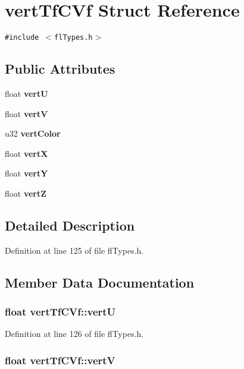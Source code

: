 \section{vert\-Tf\-CVf Struct Reference}
\label{structvertTfCVf}
{\tt \#include $<$fl\-Types.h$>$}

\subsection*{Public Attributes}
\begin{CompactItemize}
\item 
float {\bf vert\-U}
\item 
float {\bf vert\-V}
\item 
u32 {\bf vert\-Color}
\item 
float {\bf vert\-X}
\item 
float {\bf vert\-Y}
\item 
float {\bf vert\-Z}
\end{CompactItemize}


\subsection{Detailed Description}




Definition at line 125 of file fl\-Types.h.

\subsection{Member Data Documentation}
\subsubsection{\setlength{\rightskip}{0pt plus 5cm}float {\bf vert\-Tf\-CVf::vert\-U}}\label{structvertTfCVf_b605bbb90329cf79b2261af9019c8cb5}




Definition at line 126 of file fl\-Types.h.
\subsubsection{\setlength{\rightskip}{0pt plus 5cm}float {\bf vert\-Tf\-CVf::vert\-V}}\label{structvertTfCVf_c63c186e3e059597d428170ca3f298f6}




